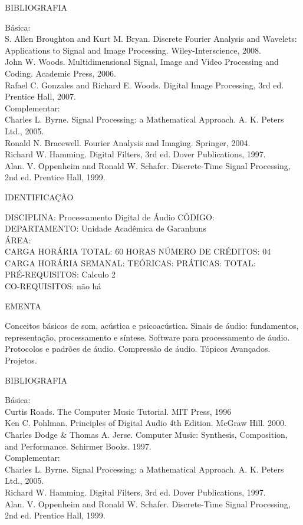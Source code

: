 \documentclass[
	12pt,				%
	openright,			%
  oneside,     %
	a4paper,			%
	chapter=TITLE,		%
	english,			%
	french,				%
	spanish,			%
	brazil				%
	]{abntex2}
\begin{document}
\begin{apendicesenv}
BIBLIOGRAFIA 

Básica:\\
S. Allen Broughton and Kurt M. Bryan. Discrete Fourier Analysis and
Wavelets: Applications to Signal and Image Processing.
Wiley-Interscience, 2008.\\
John W. Woods. Multidimensional Signal, Image and Video Processing and
Coding. Academic Press, 2006.\\
Rafael C. Gonzales and Richard E. Woods. Digital Image Processing, 3rd
ed. Prentice Hall, 2007.\\
Complementar:\\
Charles L. Byrne. Signal Processing: a Mathematical Approach. A. K.
Peters Ltd., 2005.\\
Ronald N. Bracewell. Fourier Analysis and Imaging. Springer, 2004.\\
Richard W. Hamming. Digital Filters, 3rd ed. Dover Publications, 1997.\\
Alan. V. Oppenheim and Ronald W. Schafer. Discrete-Time Signal
Processing, 2nd ed. Prentice Hall, 1999.

\newpage IDENTIFICAÇÃO

DISCIPLINA: Processamento Digital de Áudio CÓDIGO:\\ 
DEPARTAMENTO: Unidade Acadêmica de Garanhuns\\
ÁREA: \\
CARGA HORÁRIA TOTAL: 60 HORAS NÚMERO DE CRÉDITOS: 04\\
CARGA HORÁRIA SEMANAL: TEÓRICAS: PRÁTICAS: TOTAL: \\
PRÉ-REQUISITOS: Calculo 2\\
CO-REQUISITOS: não há

EMENTA 

Conceitos básicos de som, acústica e psicoacústica. Sinais de áudio:
fundamentos, representação, processamento e síntese. Software para
processamento de áudio. Protocolos e padrões de áudio. Compressão de
áudio. Tópicos Avançados. Projetos.

BIBLIOGRAFIA 

Básica:\\
Curtis Roads. The Computer Music Tutorial. MIT Press, 1996\\
Ken C. Pohlman. Principles of Digital Audio 4th Edition. McGraw Hill.
2000.\\
Charles Dodge \& Thomas A. Jerse. Computer Music: Synthesis,
Composition, and Performance. Schirmer Books. 1997.\\
Complementar:\\
Charles L. Byrne. Signal Processing: a Mathematical Approach. A. K.
Peters Ltd., 2005.\\
Richard W. Hamming. Digital Filters, 3rd ed. Dover Publications, 1997.\\
Alan. V. Oppenheim and Ronald W. Schafer. Discrete-Time Signal
Processing, 2nd ed. Prentice Hall, 1999.


\end{apendicesenv}
\end{document}
